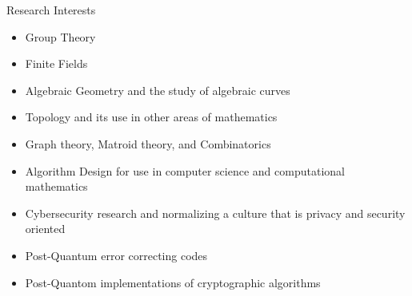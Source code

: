 \documentclass{resume} %
\begin{document}
\begin{rSection}{Research Interests}
    \begin{multicols}{2}
    \begin{itemize}
        \item Group Theory

        \item Finite Fields

        \item Algebraic Geometry and the study of algebraic curves

        \item Topology and its use in other areas of mathematics

        \item Graph theory, Matroid theory, and Combinatorics

        \item Algorithm Design for use in computer science and computational
            mathematics

        \item Cybersecurity research and normalizing a culture that is privacy
            and security oriented

        \item Post-Quantum error correcting codes

        \item Post-Quantom implementations of cryptographic algorithms
    \end{itemize}
    \end{multicols}
\end{rSection}
\end{document}
